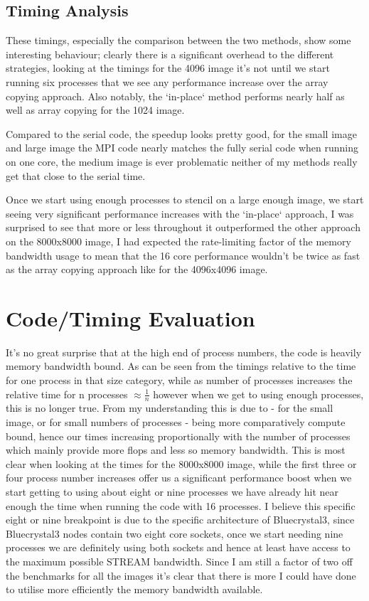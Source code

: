 \documentclass[10pt]{article}
\begin{document}
    \subsection{Timing Analysis}
    These timings, especially the comparison between the two methods, show some interesting behaviour; clearly there is a significant
    overhead to the different strategies, looking at the timings for the 4096 image it's not until we start running six processes that
    we see any performance increase over the array copying approach. Also notably, the `in-place` method performs nearly half as well
    as array copying for the 1024 image.

    Compared to the serial code, the speedup looks pretty good, for the small image and large image the MPI code nearly matches the fully serial code when running on one core, the medium image is ever problematic neither of my methods really get that close to the serial time.

    Once we start using enough processes to stencil on a large enough image, we start seeing very significant performance increases with the `in-place` approach,
    I was surprised to see that more or less throughout it outperformed the other approach on the 8000x8000 image, I had expected the rate-limiting
    factor of the memory bandwidth usage to mean that the 16 core performance wouldn't be twice as fast as the array copying approach like for the 4096x4096 image.

    \section{Code/Timing Evaluation}
    It's no great surprise that at the high end of process numbers, the code is heavily memory bandwidth bound. As can be seen from the timings
    relative to the time for one process in that size category, while as number of processes increases  the
    relative time for n processes $\approx \frac{1}{n}$ however when we get to using enough processes, this is no longer true. From my understanding
    this is due to - for the small image, or for small numbers of processes - being more comparatively compute bound, hence our times increasing
    proportionally with the number of processes which mainly provide more flops and less so memory bandwidth.
    This is most clear when looking at the times for the 8000x8000 image, while the first three or four process number increases offer us a significant
    performance boost when we start getting to using about eight or nine processes we have already hit near enough the time when running the code with 16 processes.
    I believe this specific eight or nine breakpoint is due to the specific architecture of Bluecrystal3, since Bluecrystal3 nodes contain two eight core sockets,
    once we start needing nine processes we are definitely using both sockets and hence at least have access to the maximum possible STREAM bandwidth.
    Since I am still a factor of two off the benchmarks for all the images it's clear
    that there is more I could have done to utilise more efficiently the memory bandwidth available.
\end{document}
